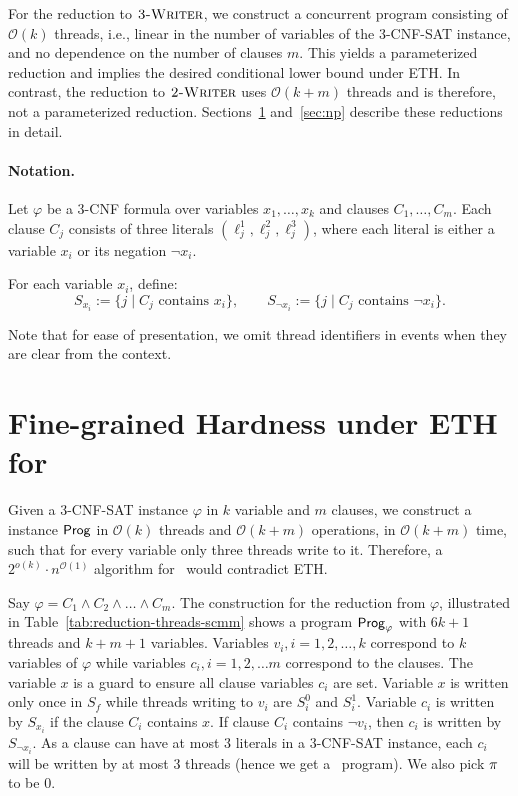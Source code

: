 For the reduction to $\textsc{3-Writer}$, we construct a concurrent program consisting of $\mathcal{O}(k)$ threads, i.e., linear in the number of variables of the 3-CNF-SAT instance, and no dependence on the number of clauses $m$. This yields a parameterized reduction and implies the desired conditional lower bound under ETH. In contrast, the reduction to $\textsc{2-Writer}$ uses $\mathcal{O}(k+m)$ threads and is therefore, not a parameterized reduction. Sections~\ref{sec:finegrained} and~\ref{sec:np} describe these reductions in detail.

\paragraph{Notation.}
Let $\varphi$ be a 3-CNF formula over variables $x_1, \dots, x_k$ and clauses $C_1, \dots, C_m$. Each clause $C_j$ consists of three literals $(\ell_j^1, \ell_j^2, \ell_j^3)$, where each literal is either a variable $x_i$ or its negation $\neg x_i$.

For each variable $x_i$, define:
\[
S_{x_i} := \{ j \mid C_j \text{ contains } x_i \}, \qquad
S_{\neg x_i} := \{ j \mid C_j \text{ contains } \neg x_i \}.
\]

Note that for ease of presentation, we omit thread identifiers in events when they are clear from the context.


\section{Fine-grained Hardness under ETH for \threewriter}\label{sec:finegrained}

Given a 3-CNF-SAT instance $\varphi$ in $k$ variable and $m$ clauses, we  construct a \vscp~ instance $\mathsf{Prog}$ in $\mathcal{O}(k)$ threads and $\mathcal{O}(k+m)$ operations, in $\mathcal{O}(k + m)$ time, such that for every variable only three threads write to it. Therefore, a $2^{o(k)} \cdot n^{\mathcal{O}(1)}$ algorithm for \vscp\ would contradict ETH.
 
\scFinegrained*


Say $\varphi=C_1\land C_2\land \dots \land C_m$. 
The construction for the reduction from $\varphi$, illustrated in Table~\ref{tab:reduction-threads-scmm} shows a program $\mathsf{Prog}_{\varphi}$ with $6k+1$ threads and $k+m+1$ variables. Variables $v_i, i=1,2,\dots,k$ correspond to $k$ variables of $\varphi$ while variables $c_i, i=1,2,\dots m$ correspond to the clauses. The variable $x$ is a guard to ensure all clause variables $c_i$ are set. Variable $x$ is written only once in $S_f$ while threads writing to $v_i$ are $S_i^0$ and $S_i^1$. Variable $c_i$ is written by $S_{x_i}$ if the clause $C_i$ contains $x$. If clause $C_i$ contains $\neg v_i$, then $c_i$ is written by $S_{\neg x_i}$. As a clause can have at most 3 literals in a 3-CNF-SAT instance, each $c_i$ will be written by at most 3 threads (hence we get a \threewriter\ program). We also pick $\pi$ to be $0$.

